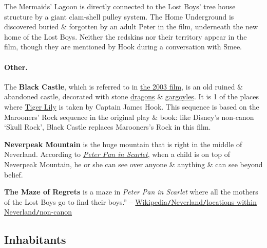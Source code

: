 \documentclass[oneside]{book}
\numberwithin{equation}{section}
\begin{document}
The Mermaids' Lagoon is directly connected to the Lost Boys' tree house structure by a giant clam-shell pulley system. The Home Underground is discovered buried \& forgotten by an adult Peter in the film, underneath the new home of the Lost Boys. Neither the redskins nor their territory appear in the film, though they are mentioned by Hook during a conversation with Smee.

\paragraph{Other.} The \textbf{Black Castle}, which is referred to in \href{https://en.wikipedia.org/wiki/Peter_Pan_(2003_film)}{the 2003 film}, is an old ruined \& abandoned castle, decorated with stone \href{https://en.wikipedia.org/wiki/Dragon}{dragons} \& \href{https://en.wikipedia.org/wiki/Gargoyle}{gargoyles}. It is 1 of the places where \href{https://en.wikipedia.org/wiki/Tiger_Lily_(Peter_Pan)}{Tiger Lily} is taken by Captain James Hook. This sequence is based on the Marooners' Rock sequence in the original play \& book: like Disney's non-canon `Skull Rock', Black Castle replaces Marooners's Rock in this film.

\textbf{Neverpeak Mountain} is the huge mountain that is right in the middle of Neverland. According to \href{https://en.wikipedia.org/wiki/Peter_Pan_in_Scarlet}{\textit{Peter Pan in Scarlet}}, when a child is on top of Neverpeak Mountain, he or she can see over anyone \& anything \& can see beyond belief.

\textbf{The Maze of Regrets} is a maze in \textit{Peter Pan in Scarlet} where all the mothers of the Lost Boys go to find their boys.'' -- \href{https://en.wikipedia.org/wiki/Neverland#Non-canon}{Wikipedia\texttt{/}Neverland\texttt{/}locations within Neverland\texttt{/}non-canon}

\subsection{Inhabitants}
\end{document}
